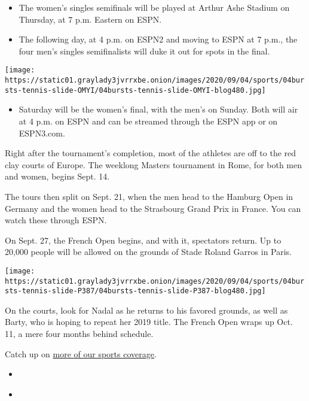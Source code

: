 \begin{itemize}
\item
  The women's singles semifinals will be played at Arthur Ashe Stadium
  on Thursday, at 7 p.m. Eastern on ESPN.
\item
  The following day, at 4 p.m. on ESPN2 and moving to ESPN at 7 p.m.,
  the four men's singles semifinalists will duke it out for spots in the
  final.
\end{itemize}

\texttt{[image: https://static01.graylady3jvrrxbe.onion/images/2020/09/04/sports/04bursts-tennis-slide-OMYI/04bursts-tennis-slide-OMYI-blog480.jpg]}

\begin{itemize}
\tightlist
\item
  Saturday will be the women's final, with the men's on Sunday. Both
  will air at 4 p.m. on ESPN and can be streamed through the ESPN app or
  on ESPN3.com.
\end{itemize}

Right after the tournament's completion, most of the athletes are off to
the red clay courts of Europe. The weeklong Masters tournament in Rome,
for both men and women, begins Sept. 14.

The tours then split on Sept. 21, when the men head to the Hamburg Open
in Germany and the women head to the Strasbourg Grand Prix in France.
You can watch these through ESPN.

On Sept. 27, the French Open begins, and with it, spectators return. Up
to 20,000 people will be allowed on the grounds of Stade Roland Garros
in Paris.

\texttt{[image: https://static01.graylady3jvrrxbe.onion/images/2020/09/04/sports/04bursts-tennis-slide-P387/04bursts-tennis-slide-P387-blog480.jpg]}

On the courts, look for Nadal as he returns to his favored grounds, as
well as Barty, who is hoping to repeat her 2019 title. The French Open
wraps up Oct. 11, a mere four months behind schedule.

Catch up on
\href{https://www.nytimes3xbfgragh.onion/section/sports}{more of our
sports coverage}.

\begin{itemize}
\tightlist
\item
  \href{https://www.nytimes3xbfgragh.onion/2020/09/05/sports/horse-racing/authentic-wins-kentucky-derby.html}{}
\item
  \href{https://www.nytimes3xbfgragh.onion/2020/09/04/sports/basketball/nba-black-coaches-diversity.html}{}
\end{itemize}

